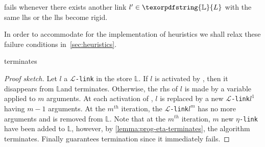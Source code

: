 \documentclass[sigconf,natbib=false,review]{acmart}
\newcommand{\llambda}{\ensuremath{\mathcal{L}}\xspace}
\newcommand{\linkMacro}[1]{\ensuremath{#1}\texttt{-link}\xspace}
\newcommand{\linkbeta}{\linkMacro{\llambda}}
\newcommand{\linketa} {\linkMacro{\eta}}
\newcommand{\lhs}{lhs\xspace}
\newcommand{\rhs}{rhs\xspace}
\newcommand{\linkStore}{\texorpdfstring{\ensuremath{\mathbb{L}}\xspace}{L}}
\begin{document}
\begin{definition}[\progBetaFail]
  \progress fails whenever
  there exists another link $l' \in \linkStore$ with the same \lhs %
  or the \lhs %
  become rigid.
  \label{def:progBetaFail}
\end{definition}

\noindent In order to accommodate for the implementation of heuristics we
shall relax these failure conditions in~\cref{sec:heuristics}.

\begin{lemma}
   terminates
\end{lemma}

\begin{proof}[Proof sketch]
  Let $l$ a \linkbeta in the store \linkStore. If $l$ is activated by
  \progBetaRH{}, then it disappears from \linkStore and 
  terminates. Otherwise, the \rhs of $l$ is made by a variable applied to $m$
  arguments. At each activation of \progBetaLL, $l$ is replaced by a new
  \linkbeta $l^1$ having $m-1$ arguments. At the $m^{th}$ iteration, the
  \linkbeta $l^m$ has no more arguments and is removed from \linkStore.
  Note that at the $m^{th}$ iteration, $m$ new \linketa have been added to
  \linkStore, however, by \cref{lemma:prog-eta-terminates}, the algorithm
  terminates. Finally \progBetaFail guarantees termination since 
  it immediately fails.
%
\end{proof}

\end{document}
